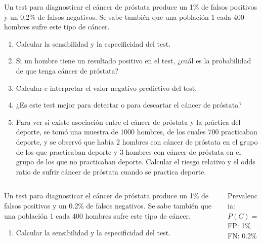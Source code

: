 \documentclass[aspectratio=169,10pt,t]{beamer}
\begin{document}
\begin{frame}[c]
\large
Un test para diagnosticar el cáncer de próstata produce un 1\% de falsos positivos y un 0.2\% de falsos negativos. Se sabe también que una población 1 cada 400 hombres sufre este tipo de cáncer.
\begin{enumerate}
\item Calcular la sensibilidad y la especificidad del test.
\item Si un hombre tiene un resultado positivo en el test, ¿cuál es la probabilidad de que tenga cáncer de próstata?
\item Calcular e interpretar el valor negativo predictivo del test.
\item ¿Es este test mejor para detectar o para descartar el cáncer de próstata?
\item Para ver si existe asociación entre el cáncer de próstata y la práctica del deporte, se tomó una muestra de 1000 hombres, de los cuales 700 practicaban deporte, y se observó que había 2 hombres con cáncer de próstata en el grupo de los que practicaban deporte y 3 hombres con cáncer de próstata en el grupo de los que no practicaban deporte. Calcular el riesgo relativo y el odds ratio de sufrir cáncer de próstata cuando se practica deporte. 
\end{enumerate}
\end{frame}

\begin{frame}
\begin{columns}
\begin{column}[T]{0.70\textwidth}
Un test para diagnosticar el cáncer de próstata produce un 1\% de falsos positivos y un 0.2\% de falsos negativos. Se sabe también que una población 1 cada 400 hombres sufre este tipo de cáncer.
\begin{enumerate}
\item Calcular la sensibilidad y la especificidad del test.
\end{enumerate}
\end{column}
\quad
\begin{column}[T]{0.30\textwidth}
\begin{datos}
Prevalencia: $P(C)=1/400$\\
FP: 1\%\\
FN: 0.2\%
\end{datos}
\end{column}
\end{columns}
\end{frame}
\end{document}
